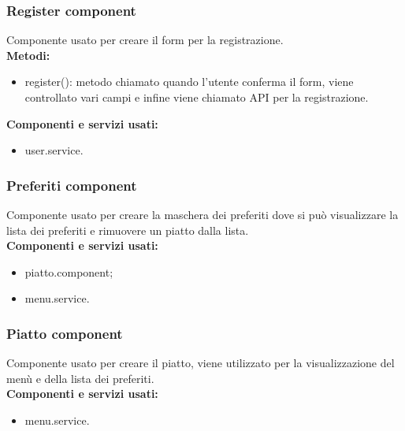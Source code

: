 \subsubsection{Register component}
Componente usato per creare il form per la registrazione.\\
\textbf{Metodi:}
\begin{itemize}
    \item register(): metodo chiamato quando l'utente conferma il form, viene controllato vari campi e infine viene chiamato API per la registrazione.
\end{itemize}
\textbf{Componenti e servizi usati:}
\begin{itemize}
    \item user.service.
\end{itemize}

\subsubsection{Preferiti component}
Componente usato per creare la maschera dei preferiti dove si può visualizzare la lista dei preferiti e rimuovere un piatto dalla lista.\\
\textbf{Componenti e servizi usati:}
\begin{itemize}
    \item piatto.component;
    \item menu.service.
\end{itemize}

\subsubsection{Piatto component}
Componente usato per creare il piatto, viene utilizzato per la visualizzazione del menù e della lista dei preferiti.\\
\textbf{Componenti e servizi usati:}
\begin{itemize}
    \item menu.service.
\end{itemize}

